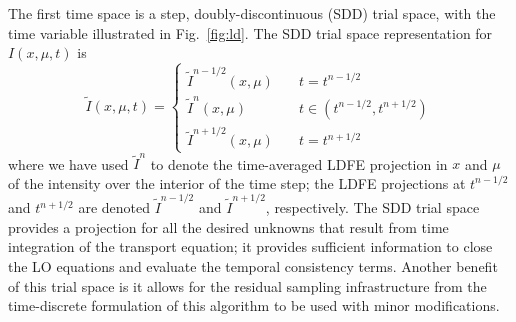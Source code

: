 \documentclass{anstrans}
\begin{document}
The first time space is a step, doubly-discontinuous (SDD) trial
space, with the time variable illustrated in Fig.~\ref{fig:ld}.  The SDD trial space
representation for $I(x,\mu,t)$ is
\begin{equation}\label{eq:time_space}
    \tilde I(x,\mu,t) = \left \{ \begin{array}{cl}
        \tilde I^{n-1/2}(x,\mu)  & \quad t = t^{n-1/2} \\ 
        \tilde I^n(x,\mu)  & \quad t \in (t^{n-1/2},t^{n+1/2}) \\               
      \tilde I^{n+1/2}(x,\mu)   &  \quad        t = t^{n+1/2}
    \end{array}           \right.
\end{equation}
where we have used $\tilde I^n$ to denote the time-averaged LDFE projection in $x$
and $\mu$ of the intensity over the interior of the time step;  the LDFE projections at
$t^{n-1/2}$ and $t^{n+1/2}$ are denoted $\tilde I^{n-1/2}$ and $\tilde I^{n+1/2}$, respectively.
The SDD trial space provides a projection for all the desired unknowns that result from time integration of the transport
equation; it provides sufficient information to close the LO equations and evaluate the temporal consistency
terms. Another benefit of this
trial space is it allows for the residual sampling infrastructure from the
time-discrete formulation of this algorithm to be used with minor modifications.
\end{document}
